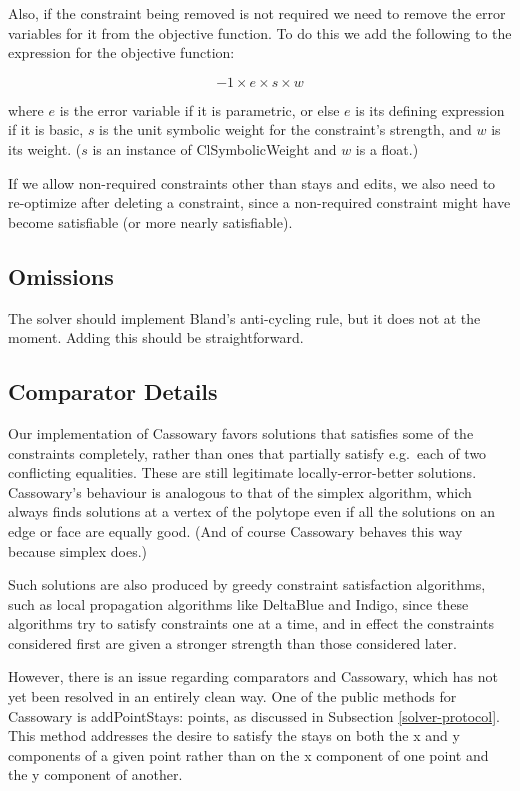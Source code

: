 \documentclass{article}
\begin{document}
Also, if the constraint being removed is not required we need to remove the
error variables for it from the objective function.  To do this we add the
following to the expression for the objective function:

$$ -1 \times e \times s \times w $$

where $e$ is the error variable if it is parametric, or else $e$ is its
defining expression if it is basic, $s$ is the unit symbolic weight for the
constraint's strength, and $w$ is its weight.  ($s$ is an instance of 
{\sf ClSymbolicWeight} and $w$ is a float.)

If we allow non-required constraints other than stays and edits, we also
need to re-optimize after deleting a constraint, since a non-required
constraint might have become satisfiable (or more nearly satisfiable).

\subsection{Omissions}

The solver should implement Bland's anti-cycling rule, but it does not at the
moment.  Adding this should be straightforward.


\subsection{Comparator Details}  
\label{comparator-details}  

Our implementation of Cassowary favors solutions that satisfies some of the
constraints completely, rather than ones that partially satisfy e.g.\ each
of two conflicting equalities.  These are still legitimate
locally-error-better solutions.  Cassowary's behaviour is analogous to that
of the simplex algorithm, which always finds solutions at a vertex of the
polytope even if all the solutions on an edge or face are equally good.
(And of course Cassowary behaves this way because simplex does.)

Such solutions are also produced by greedy constraint satisfaction
algorithms, such as local propagation algorithms like DeltaBlue and Indigo,
since these algorithms try to satisfy constraints one at a time, and in
effect the constraints considered first are given a stronger strength than
those considered later.

However, there is an issue regarding comparators and Cassowary, which has
not yet been resolved in an entirely clean way.  One of the public methods
for Cassowary is {\sf addPointStays: points}, as discussed in Subsection
\ref{solver-protocol}.  This method addresses the desire to satisfy the
stays on both the {\sf x} and {\sf y} components of a given point rather
than on the {\sf x} component of one point and the {\sf y} component of
another.
\end{document}
